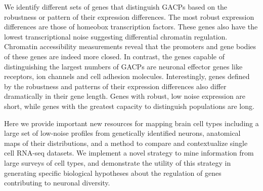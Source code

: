 We identify different sets of genes that distinguish GACPs based on the robustness or pattern of their expression differences. The most robust expression differences are those of homeobox transcription factors. These genes also have the lowest transcriptional noise suggesting differential chromatin regulation. Chromatin accessibility measurements reveal that the promoters and gene bodies of these genes are indeed more closed. In contrast, the genes capable of distinguishing the largest numbers of GACPs are neuronal effector genes like receptors, ion channels and cell adhesion molecules. Interestingly, genes defined by the robustness and patterns of their expression differences also differ dramatically in their gene length. Genes with robust, low noise expression are short, while genes with the greatest capacity to distinguish populations are long.

Here we provide important new resources for mapping brain cell types including a large set of low-noise profiles from genetically identified neurons, anatomical maps of their distributions, and a method to compare and contextualize single cell RNA-seq datasets. We implement a novel strategy to mine information from large surveys of cell types, and demonstrate the utility of this strategy in generating specific biological hypotheses about the regulation of genes contributing to neuronal diversity.


